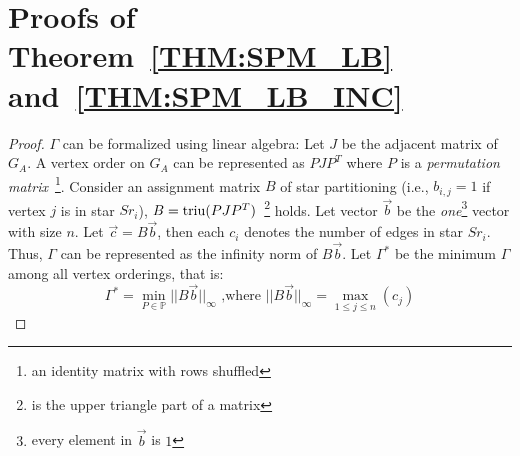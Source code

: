 \appendix
\section{Proofs of Theorem~\ref{THM:SPM_LB} and~\ref{THM:SPM_LB_INC}}
\label{apx:thm2proof}
\begin{proof}
$\Gamma$ can be formalized using linear algebra:
Let $J$ be the adjacent matrix of $G_A$.
A vertex order on $G_A$ can be represented as 
%
$PJP^T$
where $P$ %
is a %
\emph{permutation matrix}~\footnote{an identity matrix with rows shuffled}.
Consider an assignment matrix $B$ of star partitioning (i.e., $b_{i,j} = 1$ if vertex $j$ is in star $Sr_i$),
$B=\operatorname*{triu}(PJP^T)$~\footnote{ is the upper triangle part of a matrix} holds.
%
Let vector $\vec{b}$ be the \textit{one}\footnote{every element in $\vec{b}$ is $1$} 
vector with size $n$. Let $\vec{c} = B\vec{b}$, then each $c_i$ 
denotes the number of edges in star $Sr_i$. Thus, $\Gamma$ can be represented
as the infinity norm of $B\vec{b}$. Let $\Gamma^*$ be the minimum $\Gamma$ among all vertex orderings, that is:
\begin{equation}
\Gamma^* = \min_{P \in \mathbb{P}}{||B\vec{b}||_\infty} \text{ ,where } ||B\vec{b}||_\infty = \max_{1\leq j \leq n}(c_j)
\end{equation}


\end{proof}
